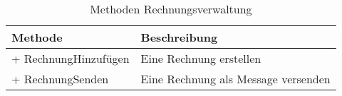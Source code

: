 \begin{table}[ht!]
\centering
\caption{Methoden Rechnungsverwaltung}
\label{tab:MethodenRechnungsverwaltung}
\begin{tabularx}{\linewidth}{@{}lX@{}}
\toprule
Methode                 & Beschreibung              \\ \midrule
+ RechnungHinzufügen    & Eine Rechnung erstellen   \\
+ RechnungSenden        & Eine Rechnung als Message versenden \\ \bottomrule
\end{tabularx}
\end{table}
